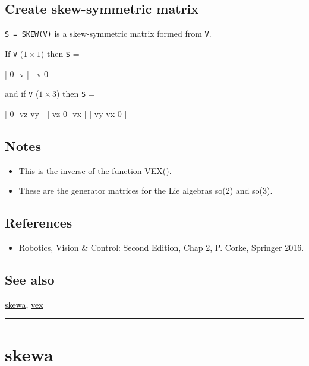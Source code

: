 \subsection*{Create skew-symmetric matrix}


\texttt{S = SKEW(V)} is a skew-symmetric matrix formed from \texttt{V}.



If \texttt{V} ($1 \times 1$) then \texttt{S} =

\begin{Code}
     | 0  -v |
     | v   0 |

\end{Code}


and if \texttt{V} ($1 \times 3$) then \texttt{S} =

\begin{Code}
     |  0  -vz   vy |
     | vz    0  -vx |
     |-vy   vx    0 |

\end{Code}

\subsection*{Notes}
\begin{itemize}
  \item This is the inverse of the function VEX().
  \item These are the generator matrices for the Lie algebras so(2) and so(3).
\end{itemize}

\subsection*{References}
\begin{itemize}
  \item Robotics, Vision \& Control: Second Edition, Chap 2,    P. Corke, Springer 2016.
\end{itemize}

\subsection*{See also}


\hyperlink{skewa}{\color{blue} skewa}, \hyperlink{vex}{\color{blue} vex}

\vspace{1.5ex}\rule{\textwidth}{1mm}

\hypertarget{skewa}{\section*{skewa}}
